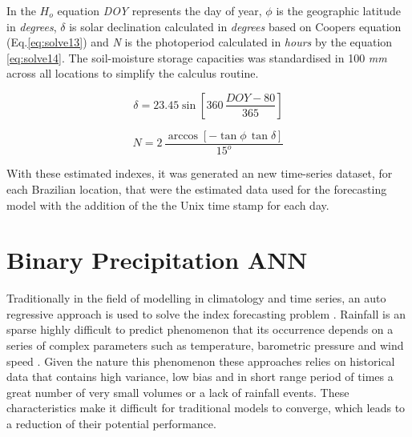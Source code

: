 In the $H_o$ equation \textit{DOY} represents the day of year, $\phi$ is the geographic latitude in \textit{degrees}, $\delta$ is solar declination calculated in \textit{degrees} 
based on Coopers\cite{cooper1969absorption} equation (Eq.\ref{eq:solve13}) and
\textit{N} is the photoperiod calculated in \textit{hours} by the equation \ref{eq:solve14}. The soil-moisture storage capacities was standardised in 100 \textit{mm} across all locations to simplify the calculus routine.

\begin{equation}
 \label{eq:solve13}
 \delta = 23.45 \sin[360 \, \frac{DOY - 80}{365}]
\end{equation}

\begin{equation}
\label{eq:solve14}
N = 2 \, \frac{\arccos[-\tan\phi \, \tan\delta]}{15^o} 
\end{equation}

With these estimated indexes, it was generated an new time-series dataset, for each Brazilian location, that were the estimated data used for the forecasting model with the addition of the the Unix time stamp for each day.

\section{Binary Precipitation ANN}
\label{sec:linux}

Traditionally in the field of modelling in climatology and time series, an auto regressive approach is used to solve the index forecasting problem \cite{rajurkar2002artificial, mishra2018rainfall, ramirez2006linear}. Rainfall is an sparse highly difficult to predict phenomenon that its occurrence depends on a series of complex parameters such as temperature, barometric pressure and wind speed \cite{sumi2012rainfall}. Given the nature this phenomenon these approaches relies on historical data that contains high variance, low bias and in short range period of times a great number of very small volumes or a lack of rainfall events. These characteristics make it difficult for traditional models to converge, which leads to a reduction of their potential performance.

